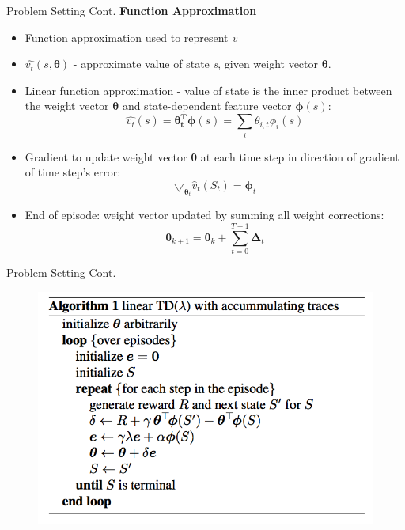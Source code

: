 \documentclass[xcolor={table}]{beamer}
\begin{document}
\begin{frame}{Problem Setting Cont.}
    \textbf{Function Approximation}
    \begin{itemize}
        \item Function approximation used to represent \textit{v}
        \item $\hat{v_{t}}(s,\boldsymbol{\theta})$ - approximate value of state \textit{s}, given weight vector $\boldsymbol{\theta}$.
        \item Linear function approximation -  value of state is the inner product between the weight vector $\boldsymbol{\theta}$ and state-dependent feature vector $\boldsymbol{\phi}(s)$:
           \begin{equation*}
               \hat{v_{t}}(s) = \boldsymbol{\theta_{t}^{T}}\boldsymbol{\phi}(s) = \sum_{i}\theta_{i,t}\phi_{i}(s)
           \end{equation*}
        \item Gradient to update weight vector $\boldsymbol{\theta}$ at each time step in direction of gradient of time step's error:
        \begin{equation*}
            \boldsymbol{\bigtriangledown}_{\boldsymbol{\theta}_{t}}\hat{v}_{t}(S_{t}) = \boldsymbol{\phi}_{t}
        \end{equation*}
        \item End of episode: weight vector updated by summing all weight corrections:
        \begin{equation*}
            \boldsymbol{\theta}_{k+1} = \boldsymbol{\theta}_{k} + \sum_{t=0}^{T-1}\boldsymbol{\Delta}_{t}
        \end{equation*}
    \end{itemize}
\end{frame}

\begin{frame}{Problem Setting Cont.}
    \begin{figure}
        \centering
        \includegraphics[scale = 0.43]{lineartd.png}
        \label{fig:my_label}
    \end{figure}
\end{frame}
\end{document}
